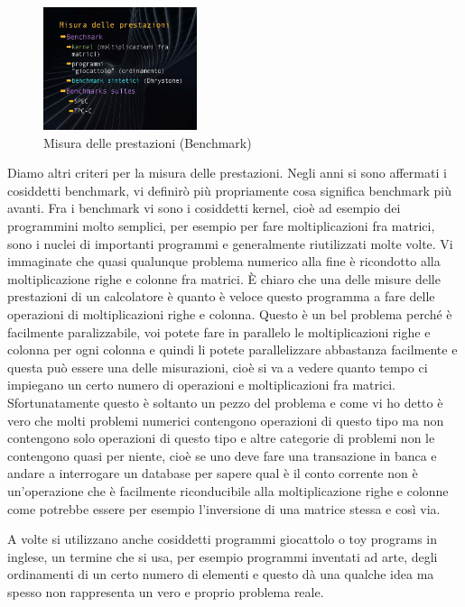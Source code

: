 \FloatBarrier
\begin{figure}[H]
  \centering
  \includegraphics[width=0.40\textwidth,
                    trim=40 40 10 40, %
                    clip]
                    {images/Lez03_p03_fig_05.png}
  \caption{Misura delle prestazioni (Benchmark)}
  \label{fig:Lez03_p03_fig_05}
\end{figure}
\FloatBarrier
\noindent

Diamo altri criteri per la misura delle prestazioni.
Negli anni si sono affermati i cosiddetti benchmark, vi definirò più propriamente cosa significa benchmark più avanti.
Fra i benchmark vi sono i cosiddetti kernel, cioè ad esempio dei programmini molto semplici, per esempio per fare moltiplicazioni fra matrici, sono i nuclei di importanti programmi e generalmente riutilizzati molte volte.
Vi immaginate che quasi qualunque problema numerico alla fine è ricondotto alla moltiplicazione righe e colonne fra matrici.
È chiaro che una delle misure delle prestazioni di un calcolatore è quanto è veloce questo programma a fare delle operazioni di moltiplicazioni righe e colonna.
Questo è un bel problema perché è facilmente paralizzabile, voi potete fare in parallelo le moltiplicazioni righe e colonna per ogni colonna e quindi li potete parallelizzare abbastanza facilmente e questa può essere una delle misurazioni, cioè si va a vedere quanto tempo ci impiegano un certo numero di operazioni e moltiplicazioni fra matrici.
Sfortunatamente questo è soltanto un pezzo del problema e come vi ho detto è vero che molti problemi numerici contengono operazioni di questo tipo ma non contengono solo operazioni di questo tipo e altre categorie di problemi non le contengono quasi per niente, cioè se uno deve fare una transazione in banca e andare a interrogare un database per sapere qual è il conto corrente non è un'operazione che è facilmente riconducibile alla moltiplicazione righe e colonne come potrebbe essere per esempio l'inversione di una matrice stessa e così via.

A volte si utilizzano anche cosiddetti programmi giocattolo o toy programs in inglese, un termine che si usa, per esempio programmi inventati ad arte, degli ordinamenti di un certo numero di elementi e questo dà una qualche idea ma spesso non rappresenta un vero e proprio problema reale.

